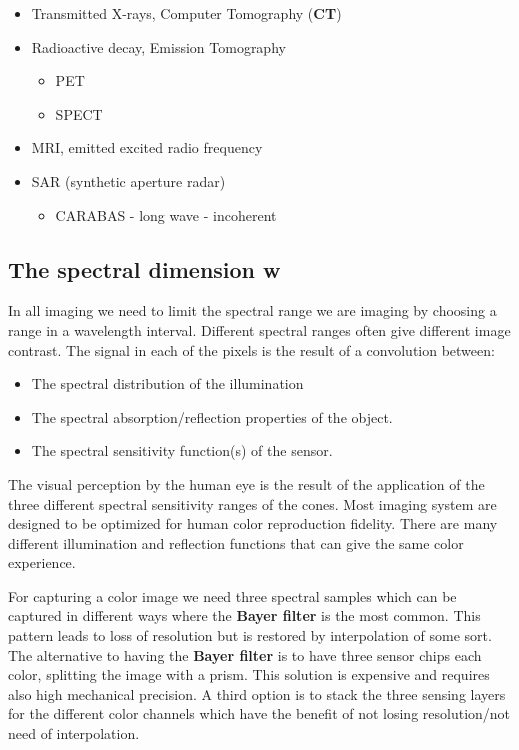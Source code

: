 \begin{itemize}
	\item Transmitted X-rays, Computer Tomography (\textbf{CT})
	\item Radioactive decay, Emission Tomography
	\begin{itemize}
		\item PET
		\item SPECT
	\end{itemize}
	\item MRI, emitted excited radio frequency
	\item SAR (synthetic aperture radar)
	\begin{itemize}
		\item CARABAS - long wave - incoherent
	\end{itemize}
\end{itemize}

\subsection*{The spectral dimension \textbf{w}}
In all imaging we need to limit the spectral range we are imaging by choosing a range in a wavelength interval. Different spectral ranges often give different image contrast. The signal in each of the pixels is the result of a convolution between:
\begin{itemize}
 	\item The spectral distribution of the illumination
 	\item The spectral absorption/reflection properties of the object.
 	\item The spectral sensitivity function(s) of the sensor. 
 \end{itemize} 

The visual perception by the human eye is the result of the application of the three different spectral sensitivity ranges of the cones. Most imaging system are designed to be optimized for human color reproduction fidelity. There are many different illumination and reflection functions that can give the same color experience. 

For capturing a color image we need three spectral samples which can be captured in different ways where the \textbf{Bayer filter} is the most common. This pattern leads to loss of resolution but is restored by interpolation of some sort. The alternative to having the \textbf{Bayer filter} is to have three sensor chips each color, splitting the image with a prism. This solution is expensive and requires also high mechanical precision. A third option is to stack the three sensing layers for the different color channels which have the benefit of not losing resolution/not need of interpolation. 

